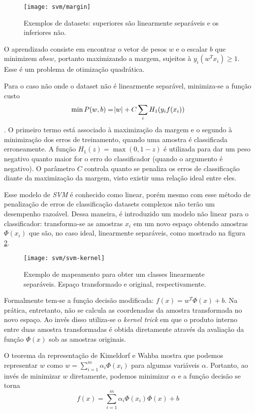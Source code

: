 \begin{figure}[h]
\centering
\texttt{[image: svm/margin]}
\caption{Exemplos de datasets: superiores são linearmente separáveis e os inferiores não.}
\label{fig:svm-margin}
\end{figure}

O aprendizado consiste em encontrar o vetor de pesos $w$ e o escalar $b$ que minimizem $abs{w}$, portanto maximizando a margem, sujeitos à $y_i(w^T x_i) \geq 1$. Esse é um problema de otimização quadrática.

Para o caso não onde o dataset não é linearmente separável, minimiza-se a função custo 
\begin{equation*}
	\min P(w,b) = \abs{w} + C\sum_i H_1(y_i f(x_i))
\end{equation*}. O primeiro termo está associado à maximização da margem e o segundo à minimização dos erros de treinamento, quando uma amostra é classificada erroneamente. A função $H_1(z)=\max(0,1-z)$ é utilizada para dar um peso negativo quanto maior for o erro do classificador (quando o argumento é negativo). O parâmetro $C$ controla quanto se penaliza os erros de classificação diante da maximização da margem, visto existir uma relação ideal entre eles.

Esse modelo de \textit{SVM} é conhecido como linear, porém mesmo com esse método de penalização de erros de classificação datasets complexos não terão um desempenho razoável. Dessa maneira, é introduzido um modelo não linear para o classificador: transforma-se as amostras $x_i$ em um novo espaço obtendo amostras $\Phi(x_i)$ que são, no caso ideal, linearmente separáveis, como mostrado na figura \ref{fig:svm-kernel}.

\begin{figure}[h]
\centering
\texttt{[image: svm/svm-kernel]}
\caption{Exemplo de mapeamento para obter um classes linearmente separáveis. Espaço transformado e original, respectivamente.}
\label{fig:svm-kernel}
\end{figure}

Formalmente tem-se a função decisão modificada: $f(x)=w^T \Phi(x) +b$.  Na prática, entretanto, não se calcula as coordenadas da amostra transformada no novo espaço. Ao invés disso utiliza-se o \textit{kernel trick} em que o produto interno entre duas amostra transformadas é obtida diretamente através da avaliação da função $\Phi(x)$ sob as amostras originais.

O teorema da representação de Kimeldorf e Wahba mostra que podemos representar $w$ como $w=\sum_{i=1}^m \alpha_i \Phi(x_i)$ para algumas variáveis $\alpha$. Portanto, ao invés de minimizar $w$ diretamente, podemos minimizar $\alpha$ e a função decisão se torna
\begin{equation}
	\label{eq:svm-decision-func}
	f(x)=\sum_{i=1}^m \alpha_i \Phi(x_i) \Phi(x) +b
\end{equation}

